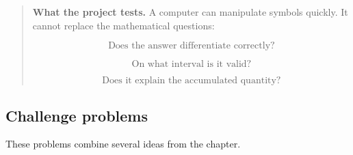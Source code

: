 \begin{quote}
\textbf{What the project tests.}
A computer can manipulate symbols quickly.  It cannot replace the mathematical
questions:

\[
\text{Does the answer differentiate correctly?}
\]

\[
\text{On what interval is it valid?}
\]

\[
\text{Does it explain the accumulated quantity?}
\]
\end{quote}

\subsection{Challenge problems}
\label{subsec:chapter-11-challenge-problems}

These problems combine several ideas from the chapter.


